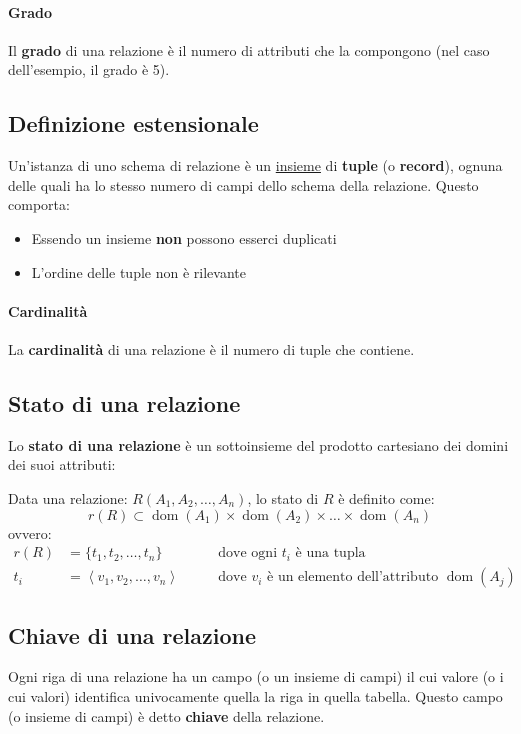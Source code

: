             \paragraph{Grado} Il \textbf{grado} di una relazione è il numero di attributi che la compongono (nel caso dell'esempio, il grado è 5).
    \subsection{Definizione estensionale} Un'istanza di uno schema di relazione è un \underline{insieme} di \textbf{tuple} (o \textbf{record}), ognuna delle quali ha lo stesso numero di campi dello schema della relazione. Questo comporta:
        \begin{itemize}
            \item Essendo un insieme \textbf{non} possono esserci duplicati
            \item L'ordine delle tuple non è rilevante
        \end{itemize}
        \paragraph{Cardinalità} La \textbf{cardinalità} di una relazione è il numero di tuple che contiene.
    \subsection{Stato di una relazione}
        Lo \textbf{stato di una relazione} è un sottoinsieme del prodotto cartesiano dei domini dei suoi attributi:
        
        Data una relazione: $ R(A_1, A_2, \dots, A_n) $, lo stato di $ R $ è definito come: 
        $$
            r(R)\subset \operatorname{dom}(A_1)\times \operatorname{dom}(A_2)\times \dots \times \operatorname{dom}(A_n)
        $$
        ovvero:
        $$
            \begin{aligned}
                r(R)&= \{t_1, t_2, \dots, t_n\}\qquad & \text{dove ogni } t_i \text{ è una tupla}\\
                t_i&= \left< v_1, v_2, \dots, v_n \right> \qquad & \text{dove } v_i \text{ è un elemento dell'attributo } \operatorname{dom}(A_j)
            \end{aligned}
        $$
    \subsection{Chiave di una relazione}
        Ogni riga di una relazione ha un campo (o un insieme di campi) il cui valore (o i cui valori) identifica univocamente quella la riga in quella tabella. Questo campo (o insieme di campi) è detto \textbf{chiave} della relazione.

